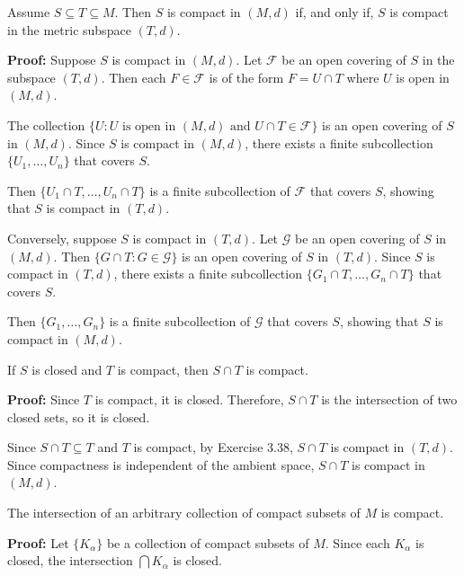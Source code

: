 \begin{problembox}
Assume \( S \subseteq T \subseteq M \). Then \( S \) is compact in \((M, d)\) if, and only if, \( S \) is compact in the metric subspace \((T, d)\).
\end{problembox}

\textbf{Proof:} Suppose $S$ is compact in $(M,d)$. Let $\mathcal{F}$ be an open covering of $S$ in the subspace $(T,d)$. Then each $F \in \mathcal{F}$ is of the form $F = U \cap T$ where $U$ is open in $(M,d)$.

The collection $\{U : U \text{ is open in } (M,d) \text{ and } U \cap T \in \mathcal{F}\}$ is an open covering of $S$ in $(M,d)$. Since $S$ is compact in $(M,d)$, there exists a finite subcollection $\{U_1, \ldots, U_n\}$ that covers $S$.

Then $\{U_1 \cap T, \ldots, U_n \cap T\}$ is a finite subcollection of $\mathcal{F}$ that covers $S$, showing that $S$ is compact in $(T,d)$.

Conversely, suppose $S$ is compact in $(T,d)$. Let $\mathcal{G}$ be an open covering of $S$ in $(M,d)$. Then $\{G \cap T : G \in \mathcal{G}\}$ is an open covering of $S$ in $(T,d)$. Since $S$ is compact in $(T,d)$, there exists a finite subcollection $\{G_1 \cap T, \ldots, G_n \cap T\}$ that covers $S$.

Then $\{G_1, \ldots, G_n\}$ is a finite subcollection of $\mathcal{G}$ that covers $S$, showing that $S$ is compact in $(M,d)$.

\begin{problembox}
If \( S \) is closed and \( T \) is compact, then \( S \cap T \) is compact.
\end{problembox}

\textbf{Proof:} Since $T$ is compact, it is closed. Therefore, $S \cap T$ is the intersection of two closed sets, so it is closed.

Since $S \cap T \subseteq T$ and $T$ is compact, by Exercise 3.38, $S \cap T$ is compact in $(T,d)$. Since compactness is independent of the ambient space, $S \cap T$ is compact in $(M,d)$.

\begin{problembox}
The intersection of an arbitrary collection of compact subsets of \( M \) is compact.
\end{problembox}

\textbf{Proof:} Let $\{K_\alpha\}$ be a collection of compact subsets of $M$. Since each $K_\alpha$ is closed, the intersection $\bigcap K_\alpha$ is closed.

